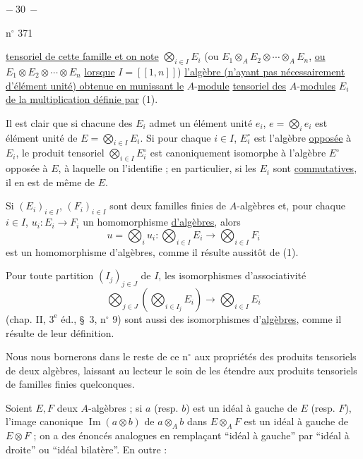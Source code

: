 \begin{center}$-\ 30\ -$\end{center}
\hfill n$^\circ$ 371

\uline{tensoriel de cette famille et on note} $\bigotimes_{i\in I}E_i$ (ou $E_1\otimes_A E_2\otimes\cdots\otimes_A E_n$, \uline{ou} $E_1\otimes E_2\otimes\cdots\otimes E_n$ \uline{lorsque} $I=\left[\!\left[1,n\right]\!\right]$) \uline{l'algèbre (n'ayant pas nécessairement d'élément unité) obtenue en munissant le} $A$-\uline{module}  \uline{tensoriel des} $A$-\uline{modules} $E_i$ \uline{de la multiplication définie par} (1).

Il est clair que si chacune des $E_i$ admet un élément unité $e_i$, $e=\bigotimes_i e_i$ est élément unité de $E=\bigotimes_{i\in I}E_i$. Si pour chaque $i\in I$, $E_i^\circ$ est l'algèbre \uline{opposée} à $E_i$, le produit tensoriel $\bigotimes_{i\in I}E_i^\circ$ est canoniquement isomorphe à l'algèbre $E^\circ$ opposée à $E$, à laquelle on l'identifie ; en particulier, si les $E_i$ sont \uline{commutatives}, il en est de même de $E$.

Si $(E_i)_{i\in I}$, $(F_i)_{i\in I}$ sont deux familles finies de $A$-algèbres et, pour chaque $i\in I$, $u_i:E_i\to F_i$ un homomorphisme \uline{d'algèbres}, alors
\[
u=\bigotimes_i u_i:\bigotimes_{i\in I}E_i\longrightarrow\bigotimes_{i\in I}F_i
\]
est un homomorphisme d'algèbres, comme il résulte aussitôt de (1).

Pour toute partition $(I_j)_{j\in J}$ de $I$, les isomorphismes d'associativité
\[
\bigotimes_{j\in J}\left(\bigotimes_{i\in I_j}E_i\right)\longrightarrow\bigotimes_{i\in I}E_i
\]
(chap. II, $3^{\mathrm e}$ éd., \S\ 3, n$^\circ$ 9) sont aussi des isomorphismes d'\uline{algèbres}, comme il résulte de leur définition.

Nous nous bornerons dans le reste de ce n$^\circ$ aux propriétés des produits tensoriels de deux algèbres, laissant au lecteur le soin de les étendre aux produits tensoriels de familles finies quelconques.

Soient $E,F$ deux $A$-algèbres ; si $a$ (resp. $b$) est un idéal à gauche de $E$ (resp. $F$), l'image canonique $\operatorname{Im}(a\otimes b)$ de $a\otimes_A b$ dans $E\otimes_A F$ est un idéal à gauche de $E\otimes F$ ; on a des énoncés analogues en remplaçant ``idéal à gauche'' par ``idéal à droite'' ou ``idéal bilatère''. En outre :

